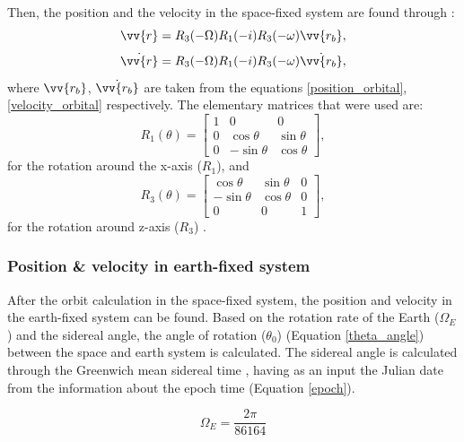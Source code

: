 Then, the position and the velocity in the space-fixed system are found through \cite{Montenbruck}:
\begin{equation}
\label{space-fixed}
\vv{r} = R_3 (-\Omega) R_1  (-i) R_3 (-\omega) \vv{r_{b}},
\end{equation}
\begin{equation}
\dot{\vv{r}} = R_3 (-\Omega) R_1  (-i) R_3 (-\omega) \dot{\vv{r_{b}}},
\end{equation}
where $\vv{r_{b}}$, $\dot{\vv{r_{b}}}$ are taken from the equations \ref{position_orbital}, \ref{velocity_orbital} respectively. The elementary matrices that were used are:
\begin{equation}
R_1(\theta) = \begin{bmatrix} 1 & 0 & 0 \\ 0 & \cos{\theta} & \sin{\theta} \\ 0 & -\sin{\theta} & \cos{\theta} \end{bmatrix},
\end{equation}
for the rotation around the x-axis ($R_{1}$), and
\begin{equation}
\label{R3}
R_3(\theta) = \begin{bmatrix} \cos{\theta} & \sin{\theta} & 0 \\ -\sin{\theta} & \cos{\theta} & 0 \\ 0 & 0 & 1 \end{bmatrix},
\end{equation}
for the rotation around z-axis ($R_{3}$) \cite{Montenbruck}.

\bigskip
\subsubsection{Position \& velocity in earth-fixed system}
\bigskip

After the orbit calculation in the space-fixed system, the position and velocity in the earth-fixed system can be found. Based on the rotation rate of the Earth ($\Omega_{E}$) and the sidereal angle, the angle of rotation ($\theta_{0}$) (Equation \ref{theta_angle}) between the space and earth system is calculated. The sidereal angle is calculated through the Greenwich mean sidereal time \cite{Vallado}, having as an input the Julian date from the information about the epoch time (Equation \ref{epoch}).

\begin{equation}
\label{rotation_rate}
\Omega_{E} = \frac{2 \pi}{86164}
\end{equation}

